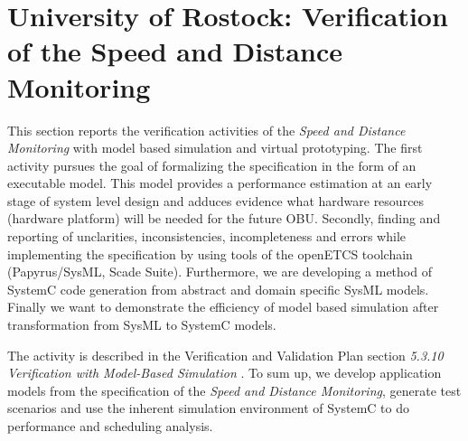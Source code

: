 %
%
%
%
%
%
%


\section{University of Rostock: Verification of the Speed and Distance
Monitoring}

This section reports the verification activities of the \emph{Speed and Distance Monitoring} with model based simulation and virtual prototyping. The first activity pursues the goal of formalizing the specification in the form of an executable model. This model provides a performance estimation at an early stage of system level design and adduces evidence what hardware resources (hardware platform) will be needed for the future OBU. Secondly, finding and reporting of unclarities, inconsistencies, incompleteness and errors while implementing the specification by using tools of the openETCS toolchain (Papyrus/SysML, Scade Suite). Furthermore, we are developing a method of SystemC code generation from abstract and domain specific SysML models. Finally we want to demonstrate the efficiency of model based simulation after transformation from SysML to SystemC models.

The activity is described in the Verification and Validation Plan section {\em 5.3.10 Verification with Model-Based Simulation} \cite{D4.1_2013}. To sum up, we develop application models from the specification of the \emph{Speed and Distance Monitoring}, generate test scenarios and use the inherent simulation environment of SystemC to do performance and scheduling analysis.

